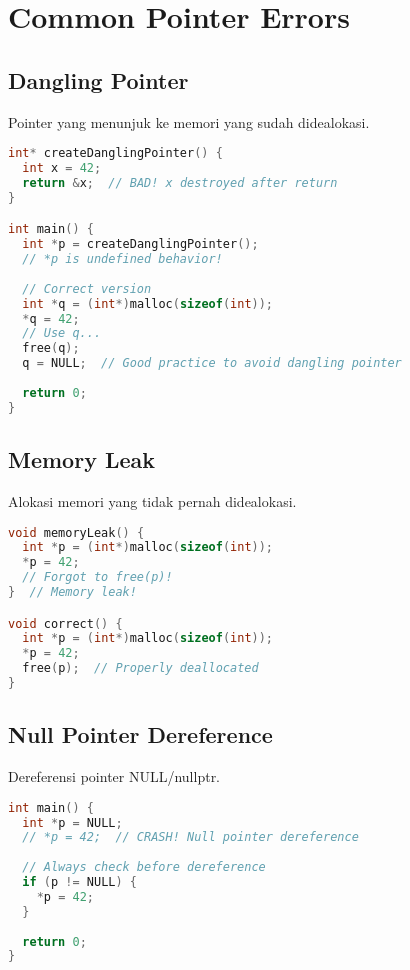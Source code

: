 \documentclass[../main.tex]{subfiles}
\begin{document}
\section{Common Pointer Errors}

\subsection{Dangling Pointer}

Pointer yang menunjuk ke memori yang sudah didealokasi.

\begin{lstlisting}[language=C, caption={Dangling pointer problem}]
int* createDanglingPointer() {
  int x = 42;
  return &x;  // BAD! x destroyed after return
}

int main() {
  int *p = createDanglingPointer();
  // *p is undefined behavior!
  
  // Correct version
  int *q = (int*)malloc(sizeof(int));
  *q = 42;
  // Use q...
  free(q);
  q = NULL;  // Good practice to avoid dangling pointer
  
  return 0;
}
\end{lstlisting}

\subsection{Memory Leak}

Alokasi memori yang tidak pernah didealokasi.

\begin{lstlisting}[language=C, caption={Memory leak}]
void memoryLeak() {
  int *p = (int*)malloc(sizeof(int));
  *p = 42;
  // Forgot to free(p)!
}  // Memory leak!

void correct() {
  int *p = (int*)malloc(sizeof(int));
  *p = 42;
  free(p);  // Properly deallocated
}
\end{lstlisting}

\subsection{Null Pointer Dereference}

Dereferensi pointer NULL/nullptr.

\begin{lstlisting}[language=C, caption={Null pointer dereference}]
int main() {
  int *p = NULL;
  // *p = 42;  // CRASH! Null pointer dereference
  
  // Always check before dereference
  if (p != NULL) {
    *p = 42;
  }
  
  return 0;
}
\end{lstlisting}
\end{document}

